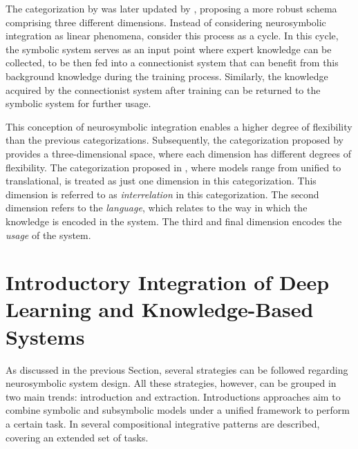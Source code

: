 The categorization by \cite{hilario_overview_nodate} was later updated by \cite{bader_dimensions_2005}, proposing a more robust schema comprising three different dimensions. Instead of considering neurosymbolic integration as linear phenomena, \cite{bader_dimensions_2005} consider this process as a cycle. In this cycle, the symbolic system serves as an input point where expert knowledge can be collected, to be then fed into a connectionist system that can benefit from this background knowledge during the training process. Similarly, the knowledge acquired by the connectionist system after training can be returned to the symbolic system for further usage.

This conception of neurosymbolic integration enables a higher degree of flexibility than the previous categorizations. Subsequently, the categorization proposed by \cite{bader_dimensions_2005} provides a three-dimensional space, where each dimension has different degrees of flexibility. The categorization proposed in \cite{hilario_overview_nodate}, where models range from unified to translational, is treated as just one dimension in this categorization. This dimension is referred to as \textit{interrelation} in this categorization. The second dimension refers to the \textit{language}, which relates to the way in which the knowledge is encoded in the system. The third and final dimension encodes the \textit{usage} of the system.

\section{Introductory Integration of Deep Learning and Knowledge-Based Systems}  \label{sec:sota_dl_kb_intregration}

As discussed in the previous Section, several strategies can be followed regarding neurosymbolic system design. All these strategies, however, can be grouped in two main trends: introduction and extraction. Introductions approaches aim to combine symbolic and subsymbolic models under a unified framework to perform a certain task. In \cite{van_bekkum_modular_2021} several compositional integrative patterns are described, covering an extended set of tasks. 

